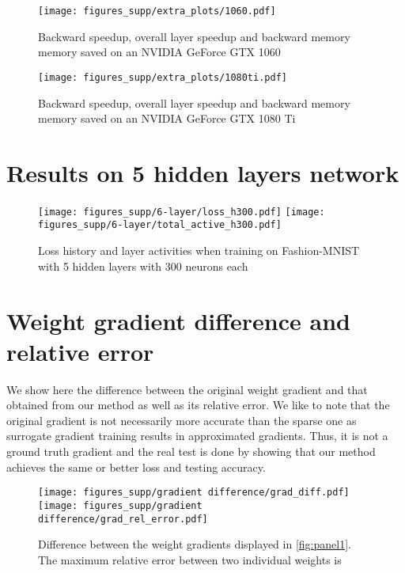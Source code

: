 \documentclass{article}
\begin{document}
\begin{figure}[!h]
\centering 
\texttt{[image: figures\_supp/extra\_plots/1060.pdf]}
\caption{Backward speedup, overall layer speedup and backward memory memory saved on an NVIDIA 
GeForce GTX 1060}
\end{figure}

\begin{figure}[!h]
\centering 
\texttt{[image: figures\_supp/extra\_plots/1080ti.pdf]}
\caption{Backward speedup, overall layer speedup and backward memory memory saved on an NVIDIA 
GeForce GTX 1080 Ti}
\end{figure}

\newpage
\section{Results on 5 hidden layers  network}

\begin{figure}[!h]
\centering 
\texttt{[image: figures\_supp/6-layer/loss\_h300.pdf]}
\texttt{[image: figures\_supp/6-layer/total\_active\_h300.pdf]}
\caption{Loss history and layer activities when training on Fashion-MNIST with 5 hidden layers with 300 neurons each}
\end{figure}

\section{Weight gradient difference and relative error}


We show here the difference between the original weight gradient and that obtained from our method as well as its relative error. We like to note that the original gradient is not necessarily more accurate than the sparse one as surrogate gradient training results in approximated gradients. Thus, it is not a ground truth gradient and the real test is done by showing that our method achieves the same or better loss and testing accuracy. 

\begin{figure}[!h]
\centering 
\texttt{[image: figures\_supp/gradient difference/grad\_diff.pdf]}
\texttt{[image: figures\_supp/gradient difference/grad\_rel\_error.pdf]}
\caption{Difference between the weight gradients displayed in \ref{fig:panel1}. The maximum relative error between two individual weights is  }
\end{figure}
\end{document}
